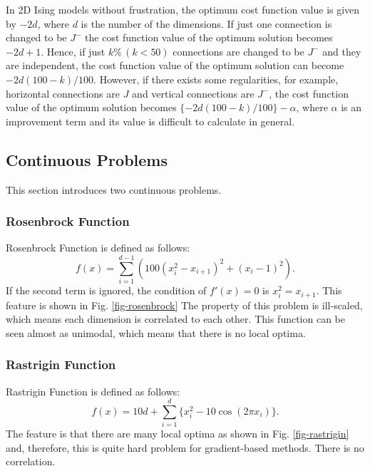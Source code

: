 In 2D Ising models without frustration,
the optimum cost function value is given by
$-2d$, where $d$ is the number of the dimensions.
If just one connection is changed to be $J^{-}$
the cost function value of the optimum solution
becomes $-2d+1$.
Hence, if just $k\% \, (k<50)$ connections are changed to be $J^{-}$
and they are independent,
the cost function value of the optimum solution
can become $-2d(100-k)/100$.
However, if there exists some regularities, for example,
horizontal connections are $J$ and vertical connections are $J^{-}$,
the cost function value of the optimum solution
becomes $\{-2d(100-k)/100\}-\alpha$,
where $\alpha$ is an improvement term and its value is difficult to calculate in general.



\subsection{Continuous Problems}
This section introduces two continuous problems.

\subsubsection{Rosenbrock Function}
Rosenbrock Function\cite{shang:rosen} is defined as follows:
\begin{equation}
 f(x)= \sum_{i=1}^{d-1} (100 (x_i^2-x_{i+1})^2+(x_i-1)^2).
\end{equation}
If the second term is ignored,
the condition of $f'(x)=0$ is $x_i^2=x_{i+1}$.
This feature is shown in Fig. \ref{fig-rosenbrock}
The property of this problem is ill-scaled,
which means each dimension is correlated to each other.
This function can be seen almost as unimodal, which means that there is no
local optima. 


\subsubsection{Rastrigin Function}
Rastrigin Function is defined as follows:
\begin{equation}
 f(x)=10d+\sum_{i=1}^d \{ x_i^2 - 10 \cos(2\pi x_i)\}.
\end{equation}
The feature is that
there are many local optima as shown in Fig. \ref{fig-rastrigin}
and,
therefore, this is quite hard problem for gradient-based methods.
There is no correlation.

